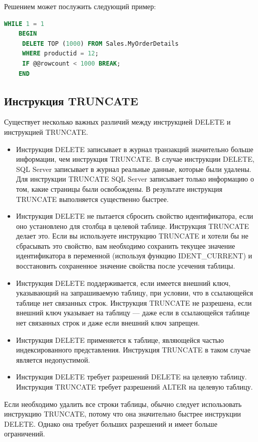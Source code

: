 Решением может послужить следующий пример:



\begin{lstlisting}[label=lst:funcReturn, language=sql]
	WHILE 1 = 1
	BEGIN
	 DELETE TOP (1000) FROM Sales.MyOrderDetails
	 WHERE productid = 12;
	 IF @@rowcount < 1000 BREAK;
	END 
\end{lstlisting}

\subsection{Инструкция TRUNCATE}

Существует несколько важных различий между инструкцией DELETE и инструкцией
TRUNCATE. 

\begin{itemize}
	\item Инструкция DELETE записывает в журнал транзакций значительно больше информации, чем инструкция TRUNCATE. В случае инструкции DELETE, SQL Server
	записывает в журнал реальные данные, которые были удалены. Для инструкции
	TRUNCATE SQL Server записывает только информацию о том, какие страницы были освобождены. В результате инструкция TRUNCATE выполняется существенно
	быстрее.
	\item Инструкция DELETE не пытается сбросить свойство идентификатора, если оно
	установлено для столбца в целевой таблице. Инструкция TRUNCATE делает это.
	Если вы используете инструкцию TRUNCATE и хотели бы не сбрасывать это свойство, вам необходимо сохранить текущее значение идентификатора в переменной (используя функцию IDENT\_CURRENT) и восстановить сохраненное значение
	свойства после усечения таблицы. 
	\item Инструкция DELETE поддерживается, если имеется внешний ключ, указывающий
	на запрашиваемую таблицу, при условии, что в ссылающейся таблице нет связанных строк. Инструкция TRUNCATE не разрешена, если внешний ключ указывает
	на таблицу — даже если в ссылающейся таблице нет связанных строк и даже
	если внешний ключ запрещен. 
	\item Инструкция DELETE применяется к таблице, являющейся частью индексированного представления. Инструкция TRUNCATE в таком случае является недопустимой. 
	\item Инструкция DELETE требует разрешений DELETE на целевую таблицу. Инструкция
	TRUNCATE требует разрешений ALTER на целевую таблицу. 
\end{itemize}

Если необходимо удалить все строки таблицы, обычно следует использовать инструкцию TRUNCATE, потому что она значительно быстрее инструкции DELETE. Однако
она требует больших разрешений и имеет больше ограничений. 


